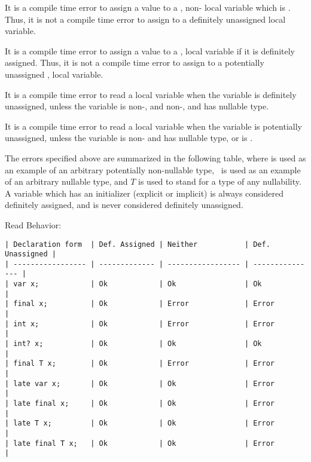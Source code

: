 \documentclass[makeidx]{article}
\begin{document}
It is a compile time error to assign a value to a \FINAL, non-\LATE{} local
variable which is .  Thus, it is not a compile time
error to assign to a definitely unassigned \FINAL{} local variable.

It is a compile time error to assign a value to a \FINAL, \LATE{} local variable
if it is definitely assigned. Thus, it is not a compile time error to
assign to a potentially unassigned \FINAL, \LATE{} local variable.


It is a compile time error to read a local variable when the variable is
definitely unassigned, unless the variable is non-\FINAL, and non-\LATE,
and has nullable type.

It is a compile time error to read a local variable when the variable is
potentially unassigned, unless the variable is non-\FINAL{} and has nullable
type, or is \LATE.

The errors specified above are summarized in the following table, where  is
used as an example of an arbitrary potentially non-nullable type, \ is
used as an example of an arbitrary nullable type, and $T$ is used to stand
for a type of any nullability.  A variable which has an initializer (explicit or
implicit) is always considered definitely assigned, and is never considered
definitely unassigned.

Read Behavior:

\begin{verbatim}
| Declaration form  | Def. Assigned | Neither           | Def. Unassigned |
| ----------------- | ------------- | ----------------- | --------------- |
| var x;            | Ok            | Ok                | Ok              |
| final x;          | Ok            | Error             | Error           |
| int x;            | Ok            | Error             | Error           |
| int? x;           | Ok            | Ok                | Ok              |
| final T x;        | Ok            | Error             | Error           |
| late var x;       | Ok            | Ok                | Error           |
| late final x;     | Ok            | Ok                | Error           |
| late T x;         | Ok            | Ok                | Error           |
| late final T x;   | Ok            | Ok                | Error           |
\end{verbatim}
\end{document}

